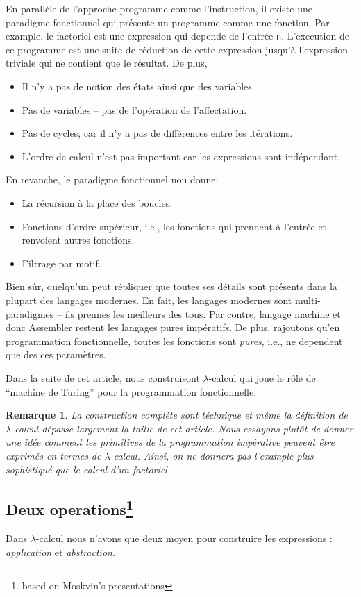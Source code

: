 \documentclass[12pt, a4paper]{article}
\newtheorem*{remark}{Remarque}
\begin{document}
En parallèle de l'approche programme comme l'instruction, il existe une paradigme fonctionnel qui présente un programme comme une fonction.
Par example, le factoriel est une expression qui depende de l'entrée \verb|n|.
L'execution de ce programme est une suite de réduction de cette expression jusqu'à l'expression triviale qui ne contient que le résultat.
De plus,
\begin{itemize}
	\item Il n'y a pas de notion des états ainsi que des variables.
	\item Pas de variables -- pas de l'opération de l'affectation.
	\item Pas de cycles, car il n'y a pas de différences entre les itérations.
	\item L'ordre de calcul n'est pas important car les expressions sont indépendant.
\end{itemize}
En revanche, le paradigme fonctionnel nou donne:
\begin{itemize}
	\item La récursion à la place des boucles.
	\item Fonctions d'ordre supérieur, i.e., les fonctions qui prennent à l'entrée et renvoient autres fonctions.
	\item Filtrage par motif.
\end{itemize}
Bien sûr, quelqu'un peut répliquer que toutes ses détails sont présents dans la plupart des langages modernes.
En fait, les langages modernes sont multi-paradigmes -- ils prennes les meilleurs des tous.
Par contre, langage machine et donc Assembler restent les langages pures impératifs.
De plus, rajoutons qu'en programmation fonctionnelle, toutes les fonctions sont \emph{pures}, i.e., ne dependent que des ces paramètres.

Dans la suite de cet article, nous construisont $\lambda$-calcul qui joue le rôle de ``machine de Turing'' pour la programmation fonctionnelle.
\begin{remark}
	La construction complète sont téchnique et même la définition de $\lambda$-calcul dépasse largement la taille de cet article. Nous essayons plutôt de donner une idée comment les primitives de la programmation impérative peuvent être exprimés en termes de $\lambda$-calcul. Ainsi, on ne donnera pas l'example plus sophistiqué que le calcul d'un factoriel.
\end{remark}

\subsection*{Deux operations\footnote{based on Moskvin's presentations}}
Dans $\lambda$-calcul nous n'avons que deux moyen pour construire les expressions : \emph{application} et \emph{abstraction}.
\end{document}
